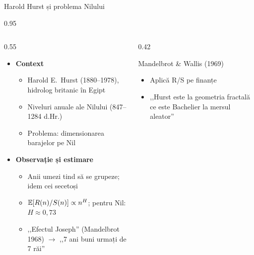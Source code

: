 \documentclass[9pt, aspectratio=169, t]{beamer}
\begin{document}
\begin{frame}[shrink=15]{Harold Hurst și problema Nilului}
\begin{cminipage}{0.95\textwidth}
\begin{columns}[T]
\begin{column}{0.55\textwidth}
\begin{itemize}\setlength{\itemsep}{1pt}
    \item \textbf{Context}
    \begin{itemize}\setlength{\itemsep}{0pt}
        \item Harold E.~Hurst (1880--1978), hidrolog britanic în Egipt
        \item Niveluri anuale ale Nilului (847--1284 d.Hr.)
        \item Problema: dimensionarea barajelor pe Nil
    \end{itemize}
    \item \textbf{Observație și estimare}
    \begin{itemize}\setlength{\itemsep}{0pt}
        \item Anii umezi tind să se grupeze; idem cei secetoși
        \item $\mathbb{E}[R(n)/S(n)]\propto n^H$; pentru Nil: $H\approx 0{,}73$
        \item ,,Efectul Joseph'' (Mandelbrot 1968) $\to$ ,,7 ani buni urmați de 7 răi''
    \end{itemize}
\end{itemize}
\end{column}
\begin{column}{0.42\textwidth}
\begin{block}{Mandelbrot \& Wallis (1969)}
\begin{itemize}\setlength{\itemsep}{0pt}
    \item Aplică R/S pe finanțe
    \item ,,Hurst este la geometria fractală ce este Bachelier la mersul aleator''
\end{itemize}
\end{block}
\end{column}
\end{columns}
\end{cminipage}
\end{frame}
\end{document}
